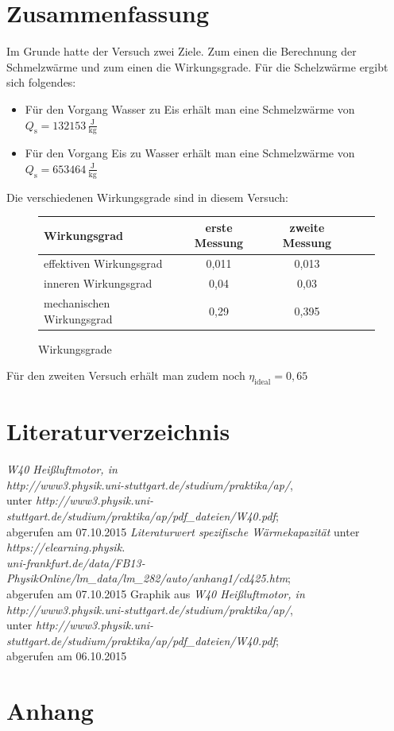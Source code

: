 \documentclass[fontsize=12pt]{scrartcl}
\begin{document}
\section{Zusammenfassung}

Im Grunde hatte der Versuch zwei Ziele. Zum einen die Berechnung der Schmelzwärme und zum einen die Wirkungsgrade.
Für die Schelzwärme ergibt sich folgendes:
\begin{itemize}
\item  Für den Vorgang Wasser zu Eis erhält man eine Schmelzwärme von $Q_{\text{s}} = 132153\,\frac{\text{J}}{\text{kg}} $ 
\item Für den Vorgang Eis zu Wasser erhält man eine Schmelzwärme von  $Q_{\text{s}} = 653464\,\frac{\text{J}}{\text{kg}} $
\end{itemize}
Die verschiedenen Wirkungsgrade sind in diesem Versuch: 

\begin{figure}[H]
\centering
\caption{Wirkungsgrade}
\begin{tabular}{|l|c|c|c|c|} \hline
Wirkungsgrad & erste Messung & zweite Messung\\\hline
effektiven Wirkungsgrad & 0,011 &  0,013 \\\hline
inneren Wirkungsgrad & 0,04 & 0,03\\\hline
mechanischen Wirkungsgrad& 0,29 & 0,395\\\hline
\end{tabular}				 
\end{figure}
Für den zweiten Versuch erhält man zudem noch $\eta_{\text{ideal}} = 0,65$
\newpage
\section{Literaturverzeichnis}

\renewcommand{\refname}{~}
\vspace{-30pt}
\begin{thebibliography}{xx}

     	\textit{\glqq  W40 Heißluftmotor\grqq , in 	\\
   					http://www3.physik.uni-stuttgart.de/studium/praktika/ap/}, \\
   					unter \textit{http://www3.physik.uni-stuttgart.de/studium/praktika/ap/pdf\_dateien/W40.pdf}; \\
   								abgerufen am 07.10.2015
   	   	\textit{\glqq Literaturwert spezifische Wärmekapazität\grqq } unter 	
   					\textit{https://elearning.physik.\\uni-frankfurt.de/data/FB13-PhysikOnline/lm\_data/lm\_282/auto/anhang1/cd425.htm}; \\
   								abgerufen am 07.10.2015							
     	Graphik aus \textit{\glqq  W40 Heißluftmotor\grqq , in 	\\
   					http://www3.physik.uni-stuttgart.de/studium/praktika/ap/}, \\
   					unter \textit{http://www3.physik.uni-stuttgart.de/studium/praktika/ap/pdf\_dateien/W40.pdf}; \\
   								abgerufen am 06.10.2015
\end{thebibliography}

\section{Anhang}
\end{document}
